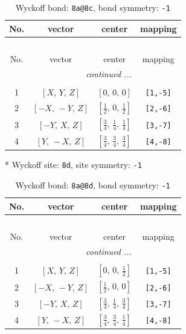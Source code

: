 \documentclass[fleqn,8pt]{jsarticle}
\begin{document}
\begin{longtable}{cccc}
\caption{Wyckoff bond: {\tt 8a@8c}, bond symmetry: {\tt -1}}
 \\
 \hline \hline
No. & vector & center & mapping \\ \hline \endfirsthead

\multicolumn{3}{l}{\tablename\ \thetable{}} \\
 \hline \hline
No. & vector & center & mapping \\ \hline \endhead

 \hline \hline
\multicolumn{3}{r}{\footnotesize\it continued ...} \\ \endfoot

 \hline \hline
\multicolumn{3}{r}{} \\ \endlastfoot

1 & $\left[ X,\, Y,\, Z \right]$ & $\left[ 0,\, 0,\, 0 \right]$ & {\tt [1,-5]} \\ \hline
2 & $\left[ - X,\, - Y,\, Z \right]$ & $\left[ \frac{1}{2},\, 0,\, \frac{1}{2} \right]$ & {\tt [2,-6]} \\ \hline
3 & $\left[ - Y,\, X,\, Z \right]$ & $\left[ \frac{3}{4},\, \frac{1}{4},\, \frac{1}{4} \right]$ & {\tt [3,-7]} \\ \hline
4 & $\left[ Y,\, - X,\, Z \right]$ & $\left[ \frac{3}{4},\, \frac{3}{4},\, \frac{3}{4} \right]$ & {\tt [4,-8]} \\
\end{longtable}
* Wyckoff site: {\tt 8d}, site symmetry: {\tt -1}
\renewcommand{\arraystretch}{1.2}
\begin{longtable}{cccc}
\caption{Wyckoff bond: {\tt 8a@8d}, bond symmetry: {\tt -1}}
 \\
 \hline \hline
No. & vector & center & mapping \\ \hline \endfirsthead

\multicolumn{3}{l}{\tablename\ \thetable{}} \\
 \hline \hline
No. & vector & center & mapping \\ \hline \endhead

 \hline \hline
\multicolumn{3}{r}{\footnotesize\it continued ...} \\ \endfoot

 \hline \hline
\multicolumn{3}{r}{} \\ \endlastfoot

1 & $\left[ X,\, Y,\, Z \right]$ & $\left[ 0,\, 0,\, \frac{1}{2} \right]$ & {\tt [1,-5]} \\ \hline
2 & $\left[ - X,\, - Y,\, Z \right]$ & $\left[ \frac{1}{2},\, 0,\, 0 \right]$ & {\tt [2,-6]} \\ \hline
3 & $\left[ - Y,\, X,\, Z \right]$ & $\left[ \frac{3}{4},\, \frac{1}{4},\, \frac{3}{4} \right]$ & {\tt [3,-7]} \\ \hline
4 & $\left[ Y,\, - X,\, Z \right]$ & $\left[ \frac{3}{4},\, \frac{3}{4},\, \frac{1}{4} \right]$ & {\tt [4,-8]} \\
\end{longtable}
\end{document}
